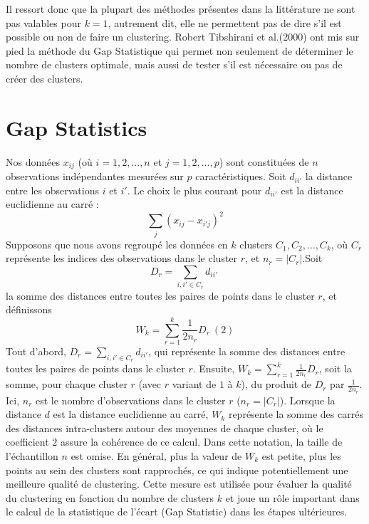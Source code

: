 Il ressort donc que la plupart des méthodes présentes dans la littérature ne sont pas valables pour \(k=1\), autrement dit, elle ne permettent pas de dire s'il est possible ou non de faire un clustering. Robert Tibshirani et al.(2000) ont mis sur pied la méthode du Gap Statistique qui permet non seulement de déterminer le nombre de clusters optimale, mais aussi de tester s'il est nécessaire ou pas de créer des clusters.

\section{Gap Statistics}

Nos données ${x_{ij}}$ (où $i = 1, 2, ..., n$ et $j = 1, 2, ..., p$) sont constituées de $n$ observations indépendantes mesurées sur $p$ caractéristiques. Soit $d_{ii'}$ la distance entre les observations $i$ et $i'$. Le choix le plus courant pour $d_{ii'}$ est la distance euclidienne au carré :
$$
\sum_{j} (x_{ij} - x_{i'j})^{2}
$$
Supposons que nous avons regroupé les données en $k$ clusters $C_{1}, C_{2}, \ldots, C_{k}$, où $C_{r}$ représente les indices des observations dans le cluster $r$, et $n_{r} = \vert C_{r} \vert$.Soit
$$
D_{r}=\sum_{i, i' \in C_{r}} d_{i i'} \
$$ 
la somme des distances entre toutes les paires de points dans le cluster $r$, et définissons
$$
W_{k}=\sum_{r=1}^{k} \frac{1}{2 n_{r}} D_{r} \ (2)
$$
Tout d'abord, $D_{r} = \sum_{i, i' \in C_{r}} d_{ii'}$, qui représente la somme des distances entre toutes les paires de points dans le cluster $r$.
Ensuite, $W_{k} = \sum_{r = 1}^{k} \frac{1}{2n_{r}} D_{r}$, soit la somme, pour chaque cluster $r$ (avec $r$ variant de $1$ à $k$), du produit de $D_{r}$ par $\frac{1}{2n_{r}}$. Ici, $n_{r}$ est le nombre d'observations dans le cluster $r$ ($n_{r} = |C_{r}|$).
Lorsque la distance $d$ est la distance euclidienne au carré, $W_{k}$ représente la somme des carrés des distances intra-clusters autour des moyennes de chaque cluster, où le coefficient $2$ assure la cohérence de ce calcul. Dans cette notation, la taille de l’échantillon $n$ est omise. En général, plus la valeur de $W_{k}$ est petite, plus les points au sein des clusters sont rapprochés, ce qui indique potentiellement une meilleure qualité de clustering. Cette mesure est utilisée pour évaluer la qualité du clustering en fonction du nombre de clusters $k$ et joue un rôle important dans le calcul de la statistique de l’écart (Gap Statistic) dans les étapes ultérieures.

